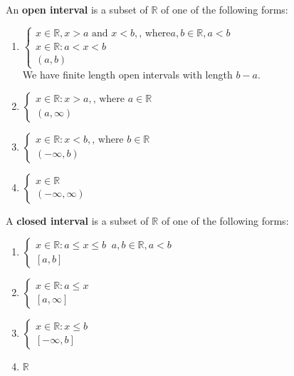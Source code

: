 \documentclass{article}
\begin{document}
\begin{center}
\end{center}

An \textbf{open interval} is a subset of $\mathbb{R}$ of one of the following forms:

\begin{enumerate}
  \item  $ \begin{cases}
    {x \in \mathbb{R}, x>a \text{ and } x<b}, \text{, where} a,b \in \mathbb{R}, a<b\\
    {x \in \mathbb{R}: a<x<b}\\
    (a,b)
  \end{cases} $\\
  We have finite length open intervals with length $b-a$.
  \item   $ \begin{cases}
    {x \in \mathbb{R}: x>a}, \text{, where } a\in \mathbb{R}\\
    (a,\infty)
  \end{cases} $
  \item   $ \begin{cases}
    {x \in \mathbb{R}: x<b}, \text{, where } b\in \mathbb{R}\\
    (-\infty,b)
  \end{cases} $
  \item   $ \begin{cases}
    {x \in \mathbb{R}}\\
    (-\infty, \infty)
  \end{cases}$
\end{enumerate}

A \textbf{closed interval} is a subset of $\mathbb{R}$ of one of the following forms:
\begin{enumerate}
  \item  $ \begin{cases}
          {x\in \mathbb{R}: a\leq x\leq b}\;\; a,b \in \mathbb{R}, a<b\\
          [a,b]
         \end{cases}$\\
  \item $ \begin{cases}
          {x\in \mathbb{R}}: a\leq x\\
          [a,\infty]
         \end{cases}$
  \item $ \begin{cases}
         {x\in \mathbb{R}}: x\leq b\\
         [-\infty,b]
        \end{cases}$
  \item $\mathbb{R}$
\end{enumerate}
\end{document}
